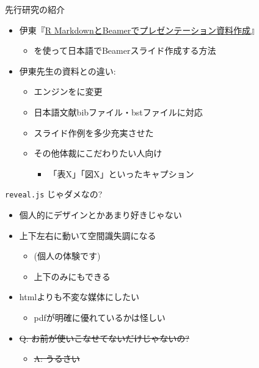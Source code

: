 \documentclass[
  14pt,
  ignorenonframetext,
]{beamer}
\providecommand{\tightlist}{%
  \setlength{\itemsep}{0pt}\setlength{\parskip}{0pt}}
\begin{document}
\begin{frame}{先行研究の紹介}
\protect\hypertarget{ux5148ux884cux7814ux7a76ux306eux7d39ux4ecb}{}

\begin{itemize}
\tightlist
\item
  伊東『\href{https://www.slideshare.net/hirokito/r-markdownbeamer-88777082}{R
  MarkdownとBeamerでプレゼンテーション資料作成}』

  \begin{itemize}
  \tightlist
  \item
    \LuaLaTeX を使って日本語でBeamerスライド作成する方法
  \end{itemize}
\item
  伊東先生の資料との違い:

  \begin{itemize}
  \tightlist
  \item
    エンジンを\XeLaTeX に変更
  \item
    日本語文献bibファイル・bstファイルに対応
  \item
    スライド作例を多少充実させた
  \item
    その他体裁にこだわりたい人向け

    \begin{itemize}
    \tightlist
    \item
      「表X」「図X」といったキャプション
    \end{itemize}
  \end{itemize}
\end{itemize}

\end{frame}

\begin{frame}{\texttt{reveal.js} じゃダメなの?}
\protect\hypertarget{reveal.js-ux3058ux3083ux30c0ux30e1ux306aux306e}{}

\begin{itemize}
\tightlist
\item
  個人的にデザインとかあまり好きじゃない
\item
  上下左右に動いて空間識失調になる

  \begin{itemize}
  \tightlist
  \item
    (個人の体験です)
  \item
    上下のみにもできる
  \end{itemize}
\item
  htmlよりも不変な媒体にしたい

  \begin{itemize}
  \tightlist
  \item
    pdfが明確に優れているかは怪しい
  \end{itemize}
\item
  \sout{Q: お前が使いこなせてないだけじゃないの?}

  \begin{itemize}
  \tightlist
  \item
    \sout{A: うるさい}
  \end{itemize}
\end{itemize}

\end{frame}
\end{document}
